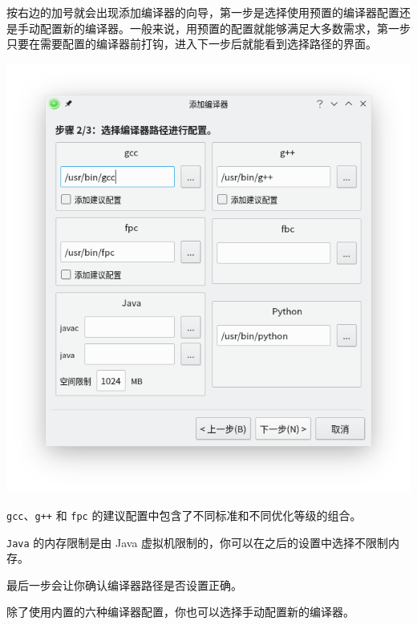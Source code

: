 \documentclass[UTF-8]{ctexart}
\begin{document}
				按右边的加号就会出现添加编译器的向导，第一步是选择使用预置的编译器配置还是手动配置新的编译器。一般来说，用预置的配置就能够满足大多数需求，第一步只要在需要配置的编译器前打钩，进入下一步后就能看到选择路径的界面。
				
				\begin{center}
					\includegraphics[scale=0.7]{pics/addcompiler.png}
				\end{center}
				
				\texttt{gcc}、\texttt{g++} 和 \texttt{fpc} 的建议配置中包含了不同标准和不同优化等级的组合。
				
				\texttt{Java} 的内存限制是由 Java 虚拟机限制的，你可以在之后的设置中选择不限制内存。
				
				最后一步会让你确认编译器路径是否设置正确。
				
				除了使用内置的六种编译器配置，你也可以选择手动配置新的编译器。
				
\end{document}
